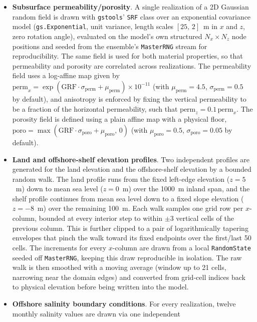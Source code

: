 \begin{itemize}
  \item \textbf{Subsurface permeability/porosity}. A single realization of a
    2D Gaussian random field is drawn with \texttt{gstools}'
    \texttt{SRF} class \citep{muller2022gstools} over an exponential covariance model (\texttt{gs.Exponential}, unit variance, length scales $[25,\,2]$~m in
    $x$ and $z$, zero rotation angle), evaluated on the model's own
    structured $N_x \times N_z$ node positions and seeded from the
    ensemble's \texttt{MasterRNG} stream for reproducibility. The same field  is used for both material properties, so that permeability and porosity are correlated across realizations. The permeability field uses a log-affine map given by $\mathrm{perm}_x = \exp(\mathrm{GRF}\cdot\sigma_{\mathrm{perm}} + \mu_{\mathrm{perm}})\times 10^{-11}$ (with $\mu_{\mathrm{perm}}=4.5$, $\sigma_{\mathrm{perm}}=0.5$ by default), and anisotropy is enforced by fixing the vertical permeability to be a fraction of the horizontal permeability, such that $\mathrm{perm}_z = 0.1\, \mathrm{perm}_x$. The porosity field is defined using a plain affine map with a physical floor,
    $\mathrm{poro} = \max(\mathrm{GRF}\cdot\sigma_{\mathrm{poro}} +
    \mu_{\mathrm{poro}},\, 0)$ (with $\mu_{\mathrm{poro}}=0.5$,
    $\sigma_{\mathrm{poro}}=0.05$ by default).
  \item \textbf{Land and offshore-shelf elevation profiles}. Two independent
    profiles are generated for the land elevation and the offshore-shelf elevation by a bounded random walk. The land profile runs from the fixed left-edge elevation ($z=5$~m) down to mean sea level ($z=0$~m) over the 1000~m inland span, and the shelf profile continues from mean sea level down to a fixed slope elevation ($z=-8$~m) over the remaining 100~m. Each walk samples one grid row per $x$-column, bounded at every interior step 
    to within $\pm 3$ vertical cells of the previous column. This is further clipped to a pair of logarithmically tapering envelopes that pinch the walk toward its fixed endpoints over the first/last 50 cells. The increments for every $x$-column are drawn from a local \texttt{RandomState} seeded off \texttt{MasterRNG}, keeping this draw reproducible in isolation. The raw walk is then smoothed with a moving average (window up to 21 cells, narrowing near the domain edges) and converted from grid-cell indices back to physical elevation before being written into the model.
  \item \textbf{Offshore salinity boundary conditions}. For every realization, twelve monthly salinity values are drawn via one independent

\end{itemize}
